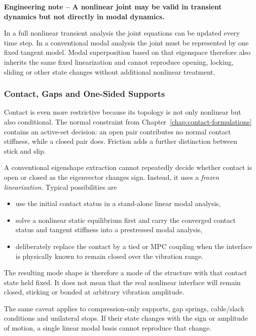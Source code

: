\begin{bbox}
\textbf{Engineering note -- A nonlinear joint may be valid in transient dynamics but not directly in modal dynamics.}

In a full nonlinear transient analysis the joint equations can be updated every
time step. In a conventional modal analysis the joint must be represented by one
fixed tangent model. Modal superposition based on that eigenspace therefore also
inherits the same fixed linearization and cannot reproduce opening, locking,
sliding or other state changes without additional nonlinear treatment.
\end{bbox}

\subsubsection{Contact, Gaps and One-Sided Supports}

Contact is even more restrictive because its topology is not only nonlinear but
also conditional. The normal constraint from Chapter~\ref{chap:contact-formulations}
contains an active-set decision: an open pair contributes no normal contact
stiffness, while a closed pair does. Friction adds a further distinction between
stick and slip.

A conventional eigenshape extraction cannot repeatedly decide whether contact is
open or closed as the eigenvector changes sign. Instead, it uses a \emph{frozen
linearization}. Typical possibilities are

\begin{itemize}
    \item use the initial contact status in a stand-alone linear modal analysis,
    \item solve a nonlinear static equilibrium first and carry the converged
          contact status and tangent stiffness into a prestressed modal analysis,
    \item deliberately replace the contact by a tied or MPC coupling when the
          interface is physically known to remain closed over the vibration range.
\end{itemize}

The resulting mode shape is therefore a mode of the structure with that contact
state held fixed. It does not mean that the real nonlinear interface will remain
closed, sticking or bonded at arbitrary vibration amplitude.

The same caveat applies to compression-only supports, gap springs, cable/slack
conditions and unilateral stops. If their state changes with the sign or
amplitude of motion, a single linear modal basis cannot reproduce that change.

